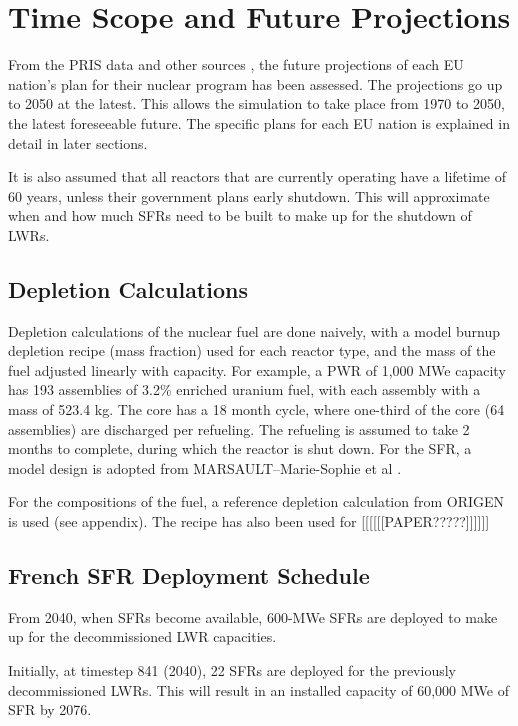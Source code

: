 \section{Time Scope and Future Projections}
From the \gls{PRIS} data and other sources \cite{world_nuclear_2017} \cite{joskow_future_2012} \cite{hatch_politics_2013},
the future projections of each EU nation's plan for their nuclear program has been assessed.
The projections go up to 2050 at the latest. This allows the simulation to take place from
1970 to 2050, the latest foreseeable future. The specific plans for each EU nation is explained
in detail in later sections.

It is also assumed that all reactors that are 
currently operating have a lifetime of 60 years, unless their government plans
early shutdown. This will approximate when and how much \gls{SFR}s need to be built
to make up for the shutdown of \gls{LWR}s.


\subsection{Depletion Calculations}
Depletion calculations of the nuclear fuel are done
naively, with a model burnup depletion recipe (mass fraction) used
for each reactor type, and the mass of the fuel 
adjusted linearly with capacity. For example, a PWR of
1,000 MWe capacity has 193 assemblies of 3.2\% enriched
uranium fuel, with each assembly with a mass of 523.4 kg.
The core has a 18 month cycle, where one-third of the 
core (64 assemblies) are discharged per refueling. The refueling
is assumed to take 2 months to complete, during which the reactor
is shut down. For the \gls{SFR}, a model design is adopted from
MARSAULT–Marie-Sophie et al \cite{marsault-marie-sophie_pre-conceptual_2012}.

For the compositions of the fuel, a reference depletion calculation
from ORIGEN is used (see appendix). The recipe has also been used for
[[[[[[PAPER?????]]]]]]

\subsection{French \gls{SFR} Deployment Schedule}

From 2040, when \gls{SFR}s become available,
600-MWe \gls{SFR}s are deployed to make up for the 
decommissioned \gls{LWR} capacities.

Initially, at timestep 841 (2040), 22 \gls{SFR}s
are deployed for the previously decommissioned
\gls{LWR}s. This will result in an installed capacity of 60,000 MWe
of \gls{SFR} by 2076.

